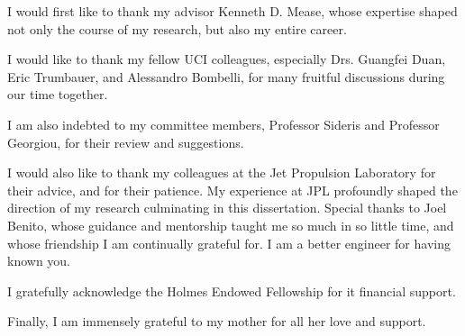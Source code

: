 \acknowledgments
{
  I would first like to thank my advisor Kenneth D. Mease, whose expertise shaped not only the course of my research, but also my entire career. 
  
  I would like to thank my fellow UCI colleagues, especially Drs. Guangfei Duan, Eric Trumbauer, and Alessandro Bombelli, for many fruitful discussions during our time together.
  
  I am also indebted to my committee members, Professor Sideris and Professor Georgiou, for their review and suggestions. 
  
  I would also like to thank my colleagues at the Jet Propulsion Laboratory for their advice, and for their patience. My experience at JPL profoundly shaped the direction of my research culminating in this dissertation. Special thanks to Joel Benito, whose guidance and mentorship taught me so much in so little time, and whose friendship I am continually grateful for. I am a better engineer for having known you. 
  
  I gratefully acknowledge the Holmes Endowed Fellowship for it financial support. 
  
  Finally, I am immensely grateful to my mother for all her love and support.
  
}


\newcommand{\mypubentry}[3]{
  \begin{tabular*}{1\textwidth}{@{\extracolsep{\fill}}p{4.5in}r}
    \textbf{#1} & \textbf{#2} \\ 
    \multicolumn{2}{@{\extracolsep{\fill}}p{.95\textwidth}}{#3}\vspace{6pt} \\
  \end{tabular*}
}
\newcommand{\mysoftentry}[3]{
  \begin{tabular*}{1\textwidth}{@{\extracolsep{\fill}}lr}
    \textbf{#1} & \url{#2} \\
    \multicolumn{2}{@{\extracolsep{\fill}}p{.95\textwidth}}
    {\emph{#3}}\vspace{-6pt} \\
  \end{tabular*}
}

